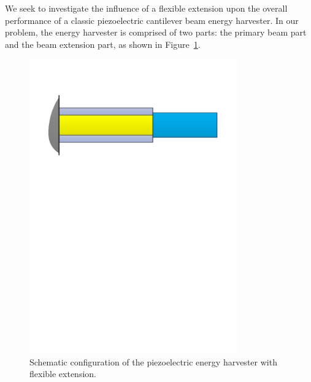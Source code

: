 \documentclass{elsarticle}
\begin{document}
We seek to investigate the influence of a flexible extension upon the overall performance of a classic piezoelectric cantilever beam energy harvester. In our problem, the energy harvester is comprised of two parts: the primary beam part and the beam extension part, as shown in Figure~\ref{fig:fig_beam_configuration}.
\begin{figure}[!htbp]
    \centering
    \includegraphics[width=0.8\textwidth]{./fig_beam_configuration.pdf}
    \caption{Schematic configuration of the piezoelectric energy harvester with flexible extension.}
    \label{fig:fig_beam_configuration}
\end{figure}
\end{document}
